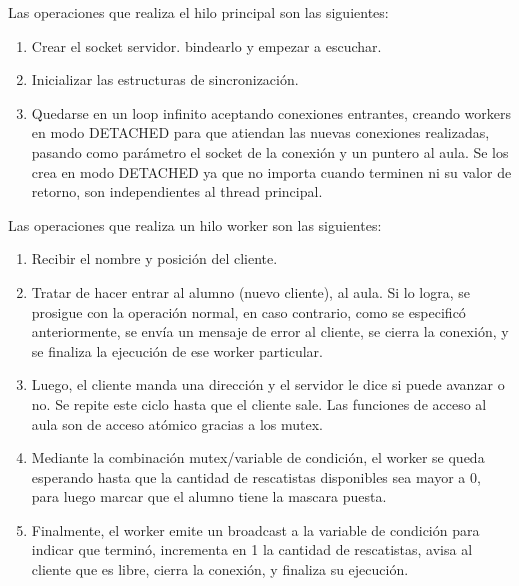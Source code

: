 Las operaciones que realiza el hilo principal son las siguientes:

\begin{enumerate}
\item Crear el socket servidor. bindearlo y empezar a escuchar.
\item Inicializar las estructuras de sincronizaci\'on.
\item Quedarse en un loop infinito aceptando conexiones entrantes, creando workers en modo DETACHED para que atiendan las nuevas conexiones realizadas, pasando como par\'ametro el socket de la conexi\'on y un puntero al aula. Se los crea en modo DETACHED ya que no importa cuando terminen ni su valor de retorno, son independientes al thread principal.
\end{enumerate}

Las operaciones que realiza un hilo worker son las siguientes:

\begin{enumerate}
\item Recibir el nombre y posici\'on del cliente.
\item Tratar de hacer entrar al alumno (nuevo cliente), al aula. Si lo logra, se prosigue con la operaci\'on normal, en caso contrario, como se especific\'o anteriormente, se env\'ia un mensaje de error al cliente, se cierra la conexi\'on, y se finaliza la ejecuci\'on de ese worker particular.
\item Luego, el cliente manda una direcci\'on y el servidor le dice si puede avanzar o no. Se repite este ciclo hasta que el cliente sale. Las funciones de acceso al aula son de acceso at\'omico gracias a los mutex.
\item Mediante la combinaci\'on mutex/variable de condici\'on, el worker se queda esperando hasta que la cantidad de rescatistas disponibles sea mayor a 0, para luego marcar que el alumno tiene la mascara puesta.
\item Finalmente, el worker emite un broadcast a la variable de condici\'on para indicar que termin\'o, incrementa en 1 la cantidad de rescatistas, avisa al cliente que es libre, cierra la conexi\'on, y finaliza su ejecuci\'on.
\end{enumerate}

